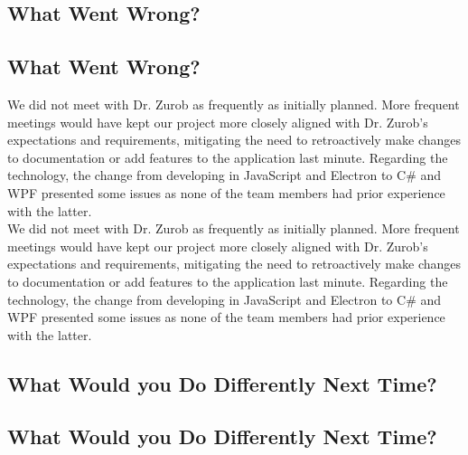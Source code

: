 \documentclass{article}
\begin{document}
\subsection{What Went Wrong?}
\subsection{What Went Wrong?}


\noindent We did not meet with Dr. Zurob as frequently as initially planned. More frequent meetings would have kept our project more closely aligned with Dr. Zurob's expectations and requirements, mitigating the need to retroactively make changes to documentation or add features to the application last minute. Regarding the technology, the change from developing in JavaScript and Electron to C# and WPF presented some issues as none of the team members had prior experience with the latter. \\
\noindent We did not meet with Dr. Zurob as frequently as initially planned. More frequent meetings would have kept our project more closely aligned with Dr. Zurob's expectations and requirements, mitigating the need to retroactively make changes to documentation or add features to the application last minute. Regarding the technology, the change from developing in JavaScript and Electron to C# and WPF presented some issues as none of the team members had prior experience with the latter. \\

\subsection{What Would you Do Differently Next Time?}
\subsection{What Would you Do Differently Next Time?}

\end{document}
